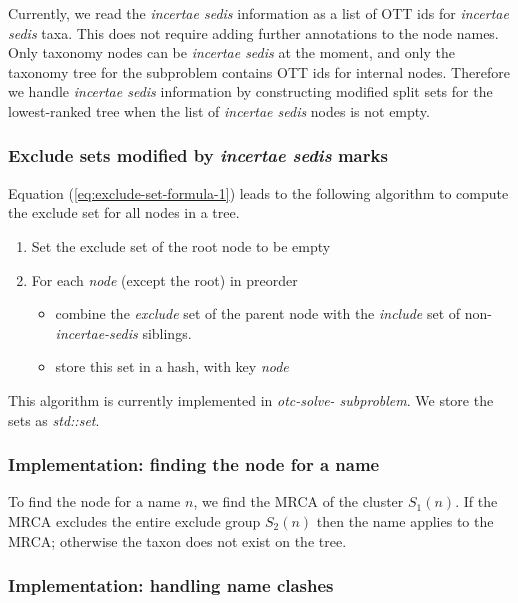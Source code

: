 \documentclass[english]{article}
\begin{document}
Currently, we read the \emph{incertae sedis} information as a list of
OTT ids for \emph{incertae sedis} taxa.
This does not require adding
further annotations to the node names.
Only taxonomy nodes can be
\emph{incertae sedis} at the moment, and only the taxonomy tree for
the subproblem contains OTT ids for internal nodes.
Therefore we
handle \emph{incertae sedis} information by constructing modified
split sets for the lowest-ranked tree when the list of \emph{incertae
sedis} nodes is not empty.

\subsubsection{Exclude sets modified by \emph{incertae sedis} marks}

Equation (\ref{eq:exclude-set-formula-1}) leads to the following
algorithm to compute the exclude set for all nodes in a tree.
\begin{enumerate} \item Set the exclude set of the root node to be
empty \item For each \emph{node} (except the root) in preorder
\begin{itemize} \item combine the \emph{exclude} set of the parent
node with the \emph{include} set of non-\emph{incertae-sedis}
siblings.
\item store this set in a hash, with key \emph{node}
\end{itemize} \end{enumerate} This algorithm is currently implemented
in \emph{otc-solve- subproblem}.
We store the sets as \emph{std::set}.

\subsubsection{Implementation: finding the node for a name}

To find the node for a name $n$, we find the MRCA of the cluster
$S_{1}(n)$.
If the MRCA excludes the entire exclude group $S_{2}(n)$
then the name applies to the MRCA; otherwise the taxon does not exist
on the tree.

\subsubsection{Implementation: handling name clashes}
\end{document}
